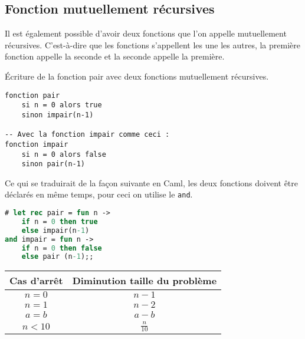 	\subsection{Fonction mutuellement récursives}
	Il est également possible d'avoir deux fonctions que l'on appelle mutuellement récursives. C'est-à-dire que les fonctions s'appellent les une les
	autres, la première fonction appelle la seconde et la seconde appelle la première.

	\begin{exemple}
		Écriture de la fonction pair avec deux fonctions mutuellement récursives.	
\begin{lstlisting}[language=algo, numbers=none, framerule=0pt, caption=Algorithme de la récursivité mutuelle pour pair]
fonction pair	
	si n = 0 alors true
	sinon impair(n-1)

-- Avec la fonction impair comme ceci : 
fonction impair
	si n = 0 alors false 
	sinon pair(n-1)
\end{lstlisting}
Ce qui se traduirait de la façon suivante en Caml, les deux fonctions doivent être déclarés en même temps, pour ceci on utilise le \texttt{and}.
\begin{lstlisting}[language=Caml, caption=Récursivité mutuelle pour pair, numbers=none, framerule=0pt]
# let rec pair = fun n ->
	if n = 0 then true
	else impair(n-1)
and impair = fun n -> 
	if n = 0 then false
	else pair (n-1);;
\end{lstlisting}

	\end{exemple}

	\begin{tabular}{c|c}
		Cas d'arrêt & Diminution taille du problème\\
		\hline
		$n=0$ & $n - 1$\\
		$n=1$ & $n - 2$\\
		$a=b$ & $a-b$\\
		$n<10$ & $\frac{n}{10}$
	\end{tabular}

